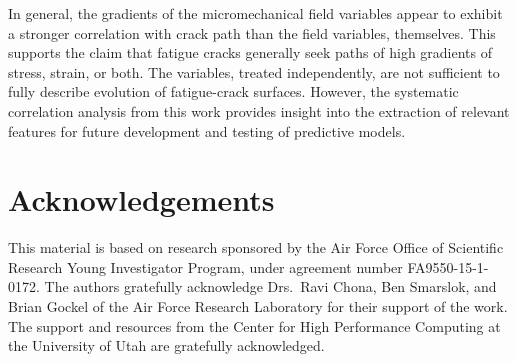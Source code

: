 In general, the gradients of the micromechanical field variables appear to exhibit a stronger correlation with crack path than the field variables, themselves. This supports the claim that fatigue cracks generally seek paths of high gradients of stress, strain, or both. The variables, treated independently, are not sufficient to fully describe evolution of fatigue-crack surfaces. However, the systematic correlation analysis from this work provides insight into the extraction of relevant features for future development and testing of predictive models.

\section{Acknowledgements}
This material is based on research sponsored by the Air Force Office of Scientific Research Young Investigator Program, under agreement number FA9550-15-1-0172. The authors gratefully acknowledge Drs.~Ravi Chona, Ben Smarslok, and Brian Gockel of the Air Force Research Laboratory for their support of the work. The support and resources from the Center for High Performance Computing at the University of Utah are gratefully acknowledged.



